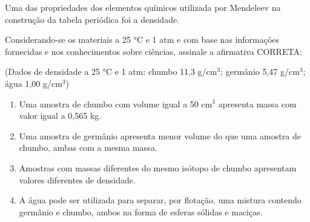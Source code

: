 \par

Uma das propriedades dos elementos químicos utilizada por Mendeleev na construção da tabela periódica foi a densidade.

\par

Considerando-se os materiais a 25 °C e 1 atm e com base nas informações fornecidas e nos conhecimentos sobre ciências, assinale a afirmativa CORRETA:

\par

(Dados de densidade a 25 °C e 1 atm: chumbo 11,3 g/cm$^3$; germânio 5,47 g/cm$^3$; água 1,00 g/cm$^3$)

\begin{enumerate}
\item Uma amostra de chumbo com volume igual a 50 cm$^3$ apresenta massa com valor igual a 0,565 kg.
\item Uma amostra de germânio apresenta menor volume do que uma amostra de chumbo, ambas com a
      mesma massa.
\item Amostras com massas diferentes do mesmo isótopo de chumbo apresentam valores diferentes de
      densidade.
\item A água pode ser utilizada para separar, por flotação, uma mistura contendo germânio e chumbo, ambos
      na forma de esferas sólidas e maciças.\end{enumerate}

